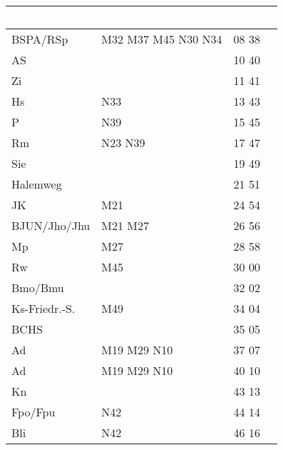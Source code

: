 \begin{tabular}{!{\color{schiefergrau}\vrule width 3pt}*{4}{l!{\color{schiefergrau}\vrule width 3pt}}}
\hline
{}
 & \textcolor{white}{\bfseries WE} \\
\hline
BSPA/RSp     & \mbus{} M32 M37 M45 \nbus{} N30 N34         & 08 38 &       \\
AS           &                                             & 10 40 &       \\
Zi           &                                             & 11 41 &       \\
Hs           & \nbus{} N33                                 & 13 43 &       \\
P            & \nbus{} N39                                 & 15 45 &       \\
Rm           & \nbus{} N23 N39                             & 17 47 &       \\
Sie          &                                             & 19 49 &       \\
Halemweg     &                                             & 21 51 &       \\
JK           & \mbus{} M21                                 & 24 54 &       \\
BJUN/Jho/Jhu & \mbus{} M21 M27                             & 26 56 &       \\
Mp           & \mbus{} M27                                 & 28 58 &       \\
Rw           & \mbus{} M45                                 & 30 00 &       \\
Bmo/Bmu      & \nuzwei{}                                   & 32 02 &       \\
Ks-Friedr.-S.& \mbus{} M49                                 & 34 04 &       \\
BCHS         &                                             & 35 05 &       \\
Ad           & \mbus{} M19 M29 \nbus{} N10                 & 37 07 &       \\
\hline
Ad           & \mbus{} M19 M29 \nbus{} N10                 & 40 10 &       \\
Kn           &                                             & 43 13 &       \\
Fpo/Fpu      & \nudrei{} \nbus{} N42                       & 44 14 &       \\
Bli          & \nbus{} N42                                 & 46 16 &       \\

\end{tabular}
